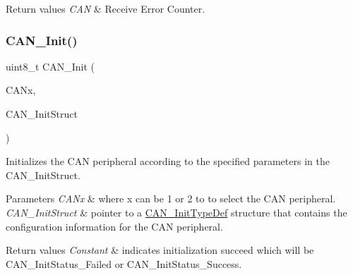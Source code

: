\begin{DoxyRetVals}{Return values}
{\em C\+AN} & Receive Error Counter. \\
\hline
\end{DoxyRetVals}
\mbox{\label{group___c_a_n___exported___functions_ga9023c35a9ab931ad4513fc5d19b4bd6c}} 
\subsubsection{\texorpdfstring{CAN\_Init()}{CAN\_Init()}}
{\footnotesize\ttfamily uint8\+\_\+t C\+A\+N\+\_\+\+Init (\begin{DoxyParamCaption}\item[{\mbox{\hyperlink{struct_c_a_n___type_def}{C\+A\+N\+\_\+\+Type\+Def}} $\ast$}]{C\+A\+Nx,  }\item[{\mbox{\hyperlink{struct_c_a_n___init_type_def}{C\+A\+N\+\_\+\+Init\+Type\+Def}} $\ast$}]{C\+A\+N\+\_\+\+Init\+Struct }\end{DoxyParamCaption})}



Initializes the C\+AN peripheral according to the specified parameters in the C\+A\+N\+\_\+\+Init\+Struct. 


\begin{DoxyParams}{Parameters}
{\em C\+A\+Nx} & where x can be 1 or 2 to to select the C\+AN peripheral. \\
\hline
{\em C\+A\+N\+\_\+\+Init\+Struct} & pointer to a \mbox{\hyperlink{struct_c_a_n___init_type_def}{C\+A\+N\+\_\+\+Init\+Type\+Def}} structure that contains the configuration information for the C\+AN peripheral. \\
\hline
\end{DoxyParams}

\begin{DoxyRetVals}{Return values}
{\em Constant} & indicates initialization succeed which will be C\+A\+N\+\_\+\+Init\+Status\+\_\+\+Failed or C\+A\+N\+\_\+\+Init\+Status\+\_\+\+Success. \\
\hline
\end{DoxyRetVals}
\mbox{\label{group___c_a_n___exported___functions_gad1a8b2499a780b5bfa4accb3597b02f4}} 
